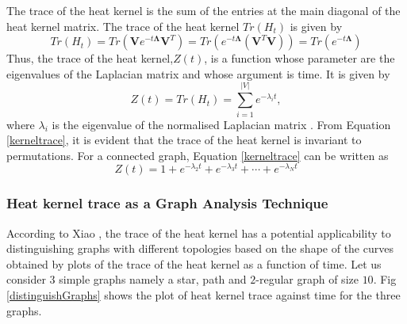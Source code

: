 \documentclass[10pt,a4paper]{article}
\begin{document}
        The trace of the heat kernel is the sum of the entries at the main diagonal of the heat kernel matrix. 
        The trace of the heat kernel $Tr(H_t)$ is given by
        \begin{equation}
        Tr(H_t) = Tr(\mathbf{V} e^{-t \mathbf{\Lambda}} \mathbf{V}^T)=Tr( e^{-t\mathbf{\Lambda}} (\mathbf{V}^T \mathbf{V})) = Tr(e^{- t\mathbf{\Lambda}})
        \end{equation}
        Thus, the trace of the heat kernel,$Z(t)$, is a function whose parameter are the eigenvalues of the Laplacian matrix and whose argument is time. It is given by                                                           
        \begin{equation}
        Z(t) = Tr(H_t) = \sum_{i=1}^{|V|} e^{-\lambda_i t},
        \label{kerneltrace}
        \end{equation}
        where $\lambda_i$ is the eigenvalue of the normalised Laplacian matrix \cite{xiao2009graph}. 
        From Equation \ref{kerneltrace}, it is evident that the trace of the heat kernel is invariant to permutations.
        For a connected graph, Equation \ref{kerneltrace} can be written as 
        \begin{equation}
        Z(t) =  1+ e^{-\lambda_2 t} + e^{-\lambda_3t} + \cdots + e^{-\lambda_N t}
        \label{alttraceformula}
        \end{equation}
        
        \subsubsection{Heat kernel trace as a Graph Analysis Technique}
        According to Xiao \cite{xiao2009graph}, the trace of the heat kernel has a potential applicability to distinguishing graphs with different topologies based on the shape of the curves obtained by plots of the trace of the heat kernel as a function of time. Let us consider $3$ simple graphs namely a star, path and $2$-regular graph of size $10$. Fig \ref{distinguishGraphs} shows the plot of heat kernel trace against time for the three graphs.
        
\end{document}
